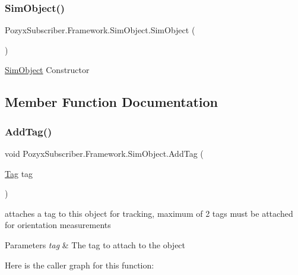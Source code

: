 \subsubsection{\texorpdfstring{Sim\+Object()}{SimObject()}}
{\footnotesize\ttfamily Pozyx\+Subscriber.\+Framework.\+Sim\+Object.\+Sim\+Object (\begin{DoxyParamCaption}{ }\end{DoxyParamCaption})}



\hyperlink{class_pozyx_subscriber_1_1_framework_1_1_sim_object}{Sim\+Object} Constructor 



\subsection{Member Function Documentation}
\mbox{\label{class_pozyx_subscriber_1_1_framework_1_1_sim_object_a9cac7e5ea0f5e6e5d0018a62ae055de0}} 
\subsubsection{\texorpdfstring{Add\+Tag()}{AddTag()}}
{\footnotesize\ttfamily void Pozyx\+Subscriber.\+Framework.\+Sim\+Object.\+Add\+Tag (\begin{DoxyParamCaption}\item[{\hyperlink{class_pozyx_subscriber_1_1_framework_1_1_tag}{Tag}}]{tag }\end{DoxyParamCaption})}



attaches a tag to this object for tracking, maximum of 2 tags must be attached for orientation measurements 


\begin{DoxyParams}{Parameters}
{\em tag} & The tag to attach to the object \\
\hline
\end{DoxyParams}
Here is the caller graph for this function\+:
\mbox{\label{class_pozyx_subscriber_1_1_framework_1_1_sim_object_a1c648d512ff2292a3f0f084f54ab9cae}} 
